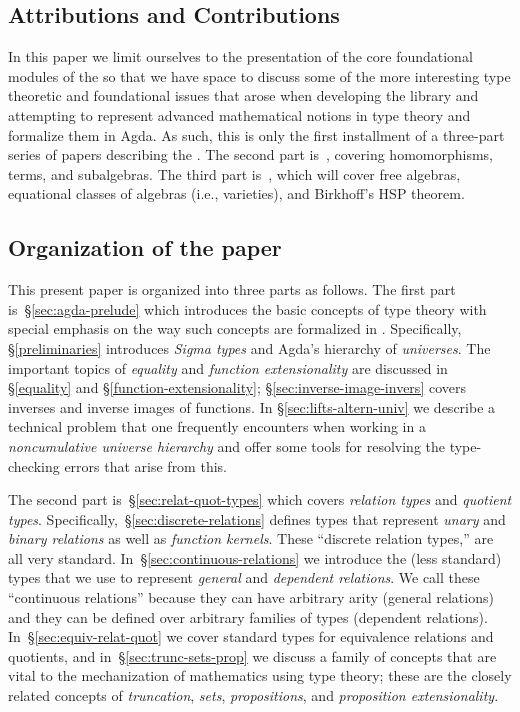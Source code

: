 \subsection{Attributions and Contributions}\label{sec:contributions}


In this paper we limit ourselves to the presentation of the core foundational modules of the \ualib so that we have space to discuss some of the more interesting type theoretic and foundational issues that arose when developing the library and attempting to represent advanced mathematical notions in type theory and formalize them in Agda.  As such, this is only the first installment of a three-part series of papers describing the \agdaualib. The second part is~\cite{DeMeo:2021-2}, covering homomorphisms, terms, and subalgebras. The third part is~\cite{DeMeo:2021-3}, which will cover free algebras, equational classes of algebras (i.e., varieties), and Birkhoff's HSP theorem.

\subsection{Organization of the paper}\label{sec:organization}

This present paper is organized into three parts as follows. The first part is~\S\ref{sec:agda-prelude} which introduces the basic concepts of type theory with special emphasis on the way such concepts are formalized in \agda. Specifically, \S\ref{preliminaries} introduces \emph{Sigma types} and Agda's hierarchy of \emph{universes}. The important topics of \emph{equality} and \emph{function extensionality} are discussed in \S\ref{equality} and \S\ref{function-extensionality}; \S\ref{sec:inverse-image-invers} covers inverses and inverse images of functions. In \S\ref{sec:lifts-altern-univ} we describe a technical problem that one frequently encounters when working in a \emph{noncumulative universe hierarchy} and offer some tools for resolving the type-checking errors that arise from this.

The second part is~\S\ref{sec:relat-quot-types} which covers \emph{relation types} and \emph{quotient types}. Specifically,~\S\ref{sec:discrete-relations} defines types that represent \emph{unary} and \emph{binary relations} as well as \emph{function kernels}. These ``discrete relation types,'' are all very standard.  In~\S\ref{sec:continuous-relations} we introduce the (less standard) types that we use to represent \emph{general} and \emph{dependent relations}. We call these ``continuous relations'' because they can have arbitrary arity (general relations) and they can be defined over arbitrary families of types (dependent relations).
In~\S\ref{sec:equiv-relat-quot} we cover standard types for equivalence relations and quotients, and in~\S\ref{sec:trunc-sets-prop} we discuss a family of concepts that are vital to the mechanization of mathematics using type theory; these are the closely related concepts of \emph{truncation}, \emph{sets}, \emph{propositions}, and \emph{proposition extensionality}.


